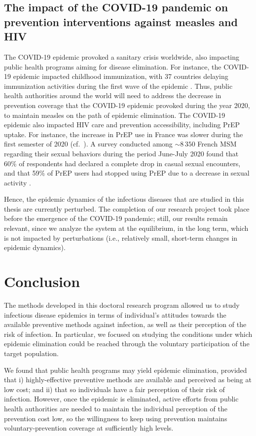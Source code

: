 \subsection{The impact of the COVID-19 pandemic on prevention interventions against measles and HIV}
The COVID-19 epidemic provoked a sanitary crisis worldwide, also impacting public health programs aiming for disease elimination. For instance, the COVID-19 epidemic impacted childhood immunization, with 37 countries delaying immunization activities during the first wave of the epidemic \cite[]{WHO_CovidMeasles}. Thus, public health authorities around the world will need to address the decrease in prevention coverage that the COVID-19 epidemic provoked during the year 2020, to maintain measles on the path of epidemic elimination. The COVID-19 epidemic also impacted HIV care and prevention accessibility, including PrEP uptake. For instance, the increase in PrEP use in France was slower during the first semester of 2020 (cf.~). A survey conducted among $\sim8\,350$ French MSM regarding their sexual behaviors during the period June-July 2020 found that 60\% of respondents had declared a complete drop in casual sexual encounters, and that 59\% of PrEP users had stopped using PrEP due to a decrease in sexual activity \cite[]{Velter2020}. 

Hence, the epidemic dynamics of the infectious diseases that are studied in this thesis are currently perturbed. The completion of our research project took place before the emergence of the COVID-19 pandemic; still, our results remain relevant, since we analyze the system at the equilibrium, in the long term, which is not impacted by perturbations (i.e., relatively small, short-term changes in epidemic dynamics). 

\section{Conclusion}
The methods developed in this doctoral research program allowed us to study infectious disease epidemics in terms of individual's attitudes towards the available preventive methods against infection, as well as their perception of the risk of infection. In particular, we focused on studying the conditions under which epidemic elimination could be reached through the voluntary participation of the target population.

We found that public health programs may yield epidemic elimination, provided that i) highly-effective preventive methods are available and perceived as being at low cost; and ii) that so individuals have a fair perception of their risk of infection. However, once the epidemic is eliminated, active efforts from public health authorities are needed to maintain the individual perception of the prevention cost low, so the willingness to keep using prevention maintains voluntary-prevention coverage at sufficiently high levels.

